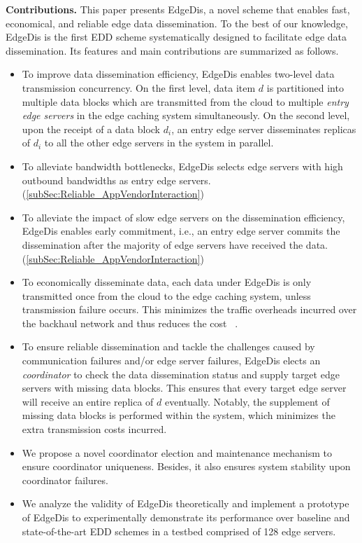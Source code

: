 \documentclass[10pt,journal,compsoc]{IEEEtran}
\begin{document}
\smallskip
\textbf{Contributions.} This paper presents EdgeDis, a novel scheme that enables fast, economical, and reliable edge data dissemination. To the best of our knowledge, EdgeDis is the first EDD scheme systematically designed to facilitate edge data dissemination. Its features and main contributions are summarized as follows.

\begin{itemize}[leftmargin=*]

    \item To improve data dissemination efficiency, EdgeDis enables two-level data transmission concurrency. On the first level, data item $d$ is partitioned into multiple data blocks which are transmitted from the cloud to multiple \textit{entry edge servers} in the edge caching system simultaneously. On the second level, upon the receipt of a data block $d_i$, an entry edge server disseminates replicas of $d_i$ to all the other edge servers in the system in parallel. 
    
    \item To alleviate bandwidth bottlenecks, EdgeDis selects edge servers with high outbound bandwidths as entry edge servers. (\cref{subSec:Reliable_AppVendorInteraction})

    \item To alleviate the impact of slow edge servers on the dissemination efficiency, EdgeDis enables early commitment, i.e., an entry edge server commits the dissemination after the majority of edge servers have received the data. (\cref{subSec:Reliable_AppVendorInteraction})
    
    
    \item To economically disseminate data, each data under EdgeDis is only transmitted once from the cloud to the edge caching system, unless transmission failure occurs. This minimizes the traffic overheads incurred over the backhaul network and thus reduces the cost ~\cite{xia2021cost}. 
    
    \item To ensure reliable dissemination and tackle the challenges caused by communication failures and/or edge server failures, EdgeDis elects an \textit{coordinator} to check the data dissemination status and supply target edge servers with missing data blocks. This ensures that every target edge server will receive an entire replica of $d$ eventually. Notably, the supplement of missing data blocks is performed within the system, which minimizes the extra transmission costs incurred. 
    
    \item We propose a novel coordinator election and maintenance mechanism to ensure coordinator uniqueness. Besides, it also ensures system stability upon coordinator failures. 
    
    \item We analyze the validity of EdgeDis theoretically and implement a prototype of EdgeDis to experimentally demonstrate its performance over baseline and state-of-the-art EDD schemes in a testbed comprised of 128 edge servers. 
\end{itemize}
\end{document}
